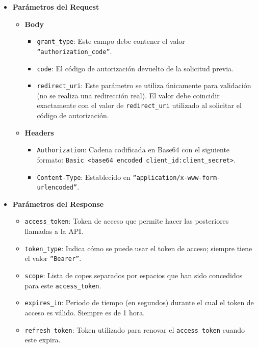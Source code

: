 \begin{itemize}
    \item \textbf{Parámetros del Request}
          \begin{itemize}
              \item \textbf{Body}
                    \begin{itemize}
                        \item \texttt{grant\_type}: Este campo debe contener el valor \texttt{``authorization\_code''}.
                        \item \texttt{code}: El código de autorización devuelto de la solicitud previa.
                        \item \texttt{redirect\_uri}: Este parámetro se utiliza únicamente para validación (no se realiza una redirección real). El valor debe coincidir exactamente con el valor de \texttt{redirect\_uri} utilizado al solicitar el código de autorización.
                    \end{itemize}
              \item \textbf{Headers}
                    \begin{itemize}
                        \item \texttt{Authorization}: Cadena codificada en Base64 con el siguiente formato: \texttt{Basic <base64 encoded client\_id:client\_secret>}.
                        \item \texttt{Content-Type}: Establecido en \texttt{``application/x-www-form-urlencoded''}.
                    \end{itemize}
          \end{itemize}
    \item \textbf{Parámetros del Response}
          \begin{itemize}
              \item \texttt{access\_token}: Token de acceso que permite hacer las posteriores llamadas a la API.
              \item \texttt{token\_type}: Indica cómo se puede usar el token de acceso; siempre tiene el valor \texttt{``Bearer''}.
              \item \texttt{scope}: Lista de copes separados por espacios que han sido concedidos para este \texttt{access\_token}.
              \item \texttt{expires\_in}: Periodo de tiempo (en segundos) durante el cual el token de acceso es válido. Siempre es de 1 hora.
              \item \texttt{refresh\_token}: Token utilizado para renovar el \texttt{access\_token} cuando este expira.
          \end{itemize}
\end{itemize}

